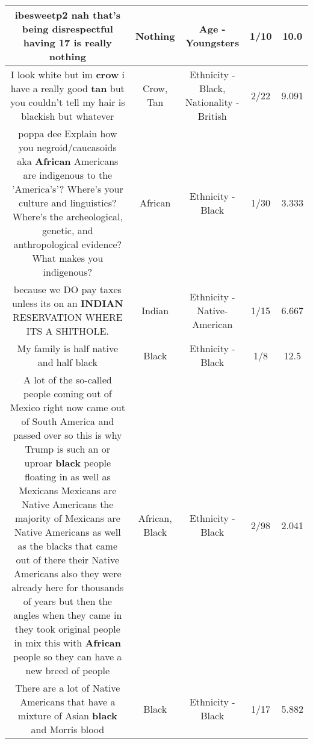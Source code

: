\documentclass[11pt]{article}
\newlength\mylength
\begin{document}
\begin{center}
\begin{longtable}{|C{.65\mylength}|C{.30\mylength}|C{.12\mylength}|C{.12\mylength}|C{.12\mylength}|}
  \small ibesweetp2 nah that's being disrespectful having 17 is really nothing\normalsize   & Nothing & Age - Youngsters & 1/10 & 10.0 \\  \hline
  \small I look white but im \textbf{crow} i have a really good \textbf{tan} but you couldn't tell my hair is blackish but whatever\normalsize   & Crow, Tan & Ethnicity - Black, Nationality - British & 2/22 & 9.091 \\  \hline
  \small poppa dee Explain how you negroid/caucasoids aka \textbf{African} Americans are indigenous to the 'America's'? Where's your culture and linguistics? Where's the archeological, genetic, and anthropological evidence? What makes you indigenous?\normalsize   & African & Ethnicity - Black & 1/30 & 3.333 \\  \hline
  \small because we DO pay taxes unless its on an \textbf{INDIAN} RESERVATION WHERE ITS A SHITHOLE.\normalsize   & Indian & Ethnicity - Native-American & 1/15 & 6.667 \\  \hline
  \small My family is half native and half black\normalsize   & Black & Ethnicity - Black & 1/8 & 12.5 \\  \hline
  \small A lot of the so-called people coming out of Mexico right now came out of South America and passed over so this is why Trump is such an or uproar \textbf{black} people floating in as well as Mexicans Mexicans are Native Americans the majority of Mexicans are Native Americans as well as the blacks that came out of there their Native Americans also they were already here for thousands of years but then the angles when they came in they took original people in mix this with \textbf{African} people so they can have a new breed of people\normalsize   & African, Black & Ethnicity - Black & 2/98 & 2.041 \\  \hline
  \small There are a lot of Native Americans that have a mixture of Asian \textbf{black} and Morris blood\normalsize   & Black & Ethnicity - Black & 1/17 & 5.882 \\  \hline

\end{longtable}
\end{center}
\end{document}
